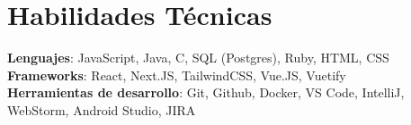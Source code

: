 \documentclass[letterpaper,11pt]{article}
\begin{document}
%
\section{Habilidades Técnicas}
 \begin{itemize}[leftmargin=0.15in, label={}]
    \small{\item{
     \textbf{Lenguajes}{: JavaScript, Java, C, SQL (Postgres), Ruby, HTML, CSS} \\
     \textbf{Frameworks}{: React, Next.JS, TailwindCSS, Vue.JS, Vuetify} \\
     \textbf{Herramientas de desarrollo}{: Git, Github, Docker, VS Code, IntelliJ, WebStorm, Android Studio, JIRA}
    }}
 \end{itemize}


\end{document}
